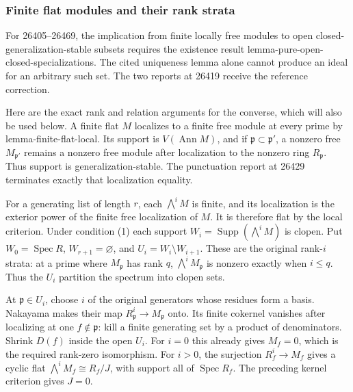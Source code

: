 \subsubsection{Finite flat modules and their rank strata}\label{algebra-proof-022-finite-flat-modules-and-their-rank-strata}

For 26405--26469, the implication from finite locally free modules to open closed-generalization-stable subsets requires the existence result lemma-\AlgebraIdentifierBreak{}pure-\AlgebraIdentifierBreak{}open-\AlgebraIdentifierBreak{}closed-\AlgebraIdentifierBreak{}specializati\AlgebraIdentifierBreak{}ons. The cited uniqueness lemma alone cannot produce an ideal for an arbitrary such set. The two reports at 26419 receive the reference correction.

Here are the exact rank and relation arguments for the converse, which will also be used below. A finite flat \(M\) localizes to a finite free module at every prime by lemma-\AlgebraIdentifierBreak{}finite-\AlgebraIdentifierBreak{}flat-\AlgebraIdentifierBreak{}local. Its support is \(V(\operatorname{Ann}M)\), and if \(\mathfrak p\subset\mathfrak p'\), a nonzero free \(M_{\mathfrak p'}\) remains a nonzero free module after localization to the nonzero ring \(R_{\mathfrak p}\). Thus support is generalization-stable. The punctuation report at 26429 terminates exactly that localization equality.

For a generating list of length \(r\), each \(\bigwedge^i M\) is finite, and its localization is the exterior power of the finite free localization of \(M\). It is therefore flat by the local criterion. Under condition (1) each support \(W_i=\operatorname{Supp}(\bigwedge^iM)\) is clopen. Put \(W_0=\operatorname{Spec}R\), \(W_{r+1}=\varnothing\), and \(U_i=W_i\setminus W_{i+1}\). These are the original rank-\(i\) strata: at a prime where \(M_{\mathfrak p}\) has rank \(q\), \(\bigwedge^i M_{\mathfrak p}\) is nonzero exactly when \(i\le q\). Thus the \(U_i\) partition the spectrum into clopen sets.

At \(\mathfrak p\in U_i\), choose \(i\) of the original generators whose residues form a basis. Nakayama makes their map \(R_{\mathfrak p}^i\to M_{\mathfrak p}\) onto. Its finite cokernel vanishes after localizing at one \(f\notin\mathfrak p\): kill a finite generating set by a product of denominators. Shrink \(D(f)\) inside the open \(U_i\). For \(i=0\) this already gives \(M_f=0\), which is the required rank-zero isomorphism. For \(i>0\), the surjection \(R_f^i\to M_f\) gives a cyclic flat \(\bigwedge^iM_f\cong R_f/J\), with support all of \(\operatorname{Spec}R_f\). The preceding kernel criterion gives \(J=0\).

